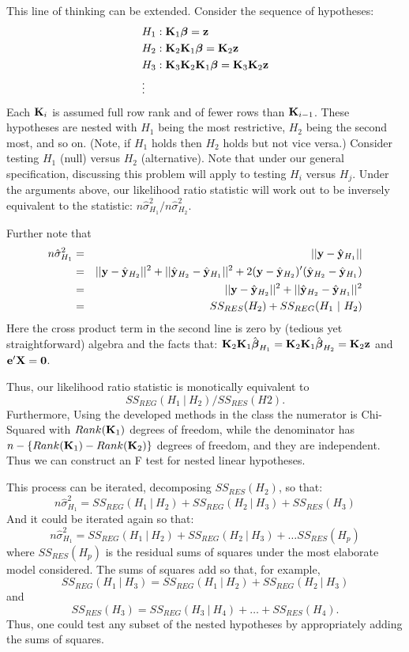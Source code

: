This line of thinking can be extended. Consider the sequence of hypotheses:
\begin{align*}
 & H_1 :\mathbf{K}_1 \boldsymbol{\beta} = \mathbf{z} \\
 & H_2 :\mathbf{K}_2 \mathbf{K}_1 \boldsymbol{\beta} = \mathbf{K}_2 \mathbf{z} \\
 & H_3 :\mathbf{K}_3 \mathbf{K}_2 \mathbf{K}_1 \boldsymbol{\beta} = \mathbf{K}_3 \mathbf{K}_2 \mathbf{z} \\
 & \vdots 
\end{align*}
Each $\mathbf{K}_i$ is assumed full row rank and of fewer rows than $\mathbf{K}_{i-1}$. 
These hypotheses are nested with $H_1$ being the most restrictive, $H_2$ being the
second most, and so on. (Note, if $H_1$ holds then $H_2$ holds but not vice versa.)
Consider
testing $H_{1}$ (null) versus $H_{2}$ (alternative). Note that under our
general specification, discussing this problem will apply to testing $H_i$ versus $H_j$. 
Under the arguments
above, our likelihood ratio statistic will work out to be inversely equivalent to
the statistic: $n\hat \sigma^2_{H_1} / n\hat \sigma^2_{H_2}$. 


Further note that
\begin{eqnarray*}
n\hat \sigma^2_{H_1}
& = &||\mathbf{y} - \hat {\mathbf{y}}_{H_1}|| \\
& = & ||\mathbf{y} - \hat {\mathbf{y}}_{H_2}||^2  + ||\hat {\mathbf{y}}_{H_2} - \hat {\mathbf{y}}_{H_1}||^2
+ 2 (\mathbf{y} - \hat {\mathbf{y}}_{H_2})' (\hat {\mathbf{y}}_{H_2} - \hat {\mathbf{y}}_{H_1}) \\
& = & ||\mathbf{y} - \hat {\mathbf{y}}_{H_2}||^2  + ||\hat {\mathbf{y}}_{H_2} - \hat {\mathbf{y}}_{H_1}||^2 \\
& = & SS_{RES}(H_2) + SS_{REG}(H_1 ~|~ H_2)
\end{eqnarray*}
Here the cross product term in the second line is zero by (tedious yet straightforward) algebra
and the facts that:
$\mathbf{K}_2 \mathbf{K}_1 \hat {\boldsymbol{\beta}}_{H_1} = \mathbf{K}_2 \mathbf{K}_1 \hat {\boldsymbol{\beta}}_{H_2} = \mathbf{K}_2 \mathbf{z}$ and $\mathbf{e}' \mathbf{X} = \mathbf{0}$. 

Thus, our likelihood ratio statistic is monotically equivalent to
$$SS_{REG}(H_1 ~|~ H_2) / SS_{RES}(H2).$$
Furthermore,
Using the developed methods in the class the numerator is Chi-Squared with
$Rank(\mathbf{K}_1)$ degrees of freedom, while the denominator has $n - \{Rank(\mathbf{K}_1) - Rank(\mathbf{K}_2)\}$ 
degrees of freedom, and they are independent. Thus we can construct an F test for nested
linear hypotheses.

This process can be iterated, decomposing $SS_{RES}(H_2)$, so that:
$$
n\hat \sigma^2_{H_1}
= SS_{REG}(H_1 ~|~ H_2) + SS_{REG}(H_2 ~|~ H_3) + SS_{RES}(H_3)
$$
And it could be iterated again so that:
$$
n\hat \sigma^2_{H_1}
= SS_{REG}(H_1 ~|~ H_2) + SS_{REG}(H_2 ~|~ H_3) + \ldots SS_{RES}(H_p)
$$
where $SS_{RES}(H_p)$ is the residual sums of squares under the most elaborate model considered.
The sums of squares add so that, for example,
$$
SS_{REG}(H_1 ~|~ H_3) = SS_{REG}(H_1 ~|~ H_2) + SS_{REG}(H_2 ~|~ H_3)
$$
and
$$
SS_{RES}(H_3) = SS_{REG}(H_3 ~|~ H_4) + \ldots + SS_{RES}(H_4).
$$
Thus, one could test any subset of the nested hypotheses by appropriately adding the sums of
squares.

